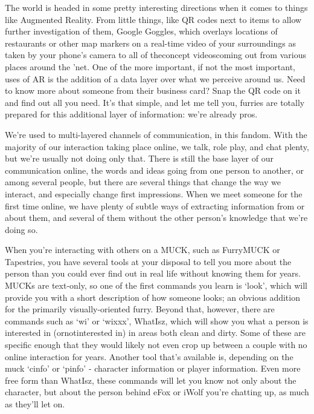 
The world is headed in some pretty interesting directions when it comes to things like Augmented Reality. From little things, like QR codes next to items to allow further investigation of them, Google Goggles, which overlays locations of restaurants or other map markers on a real-time video of your surroundings as taken by your phone's camera to all of theconcept videoscoming out from various places around the 'net. One of the more important, if not the most important, uses of AR is the addition of a data layer over what we perceive around us. Need to know more about someone from their business card? Snap the QR code on it and find out all you need. It's that simple, and let me tell you, furries are totally prepared for this additional layer of information: we're already pros.

We're used to multi-layered channels of communication, in this fandom. With the majority of our interaction taking place online, we talk, role play, and chat plenty, but we're usually not doing only that. There is still the base layer of our communication online, the words and ideas going from one person to another, or among several people, but there are several things that change the way we interact, and especially change first impressions. When we meet someone for the first time online, we have plenty of subtle ways of extracting information from or about them, and several of them without the other person's knowledge that we're doing so.

When you're interacting with others on a MUCK, such as FurryMUCK or Tapestries, you have several tools at your disposal to tell you more about the person than you could ever find out in real life without knowing them for years. MUCKs are text-only, so one of the first commands you learn is `look', which will provide you with a short description of how someone looks; an obvious addition for the primarily visually-oriented furry. Beyond that, however, there are commands such as `wi' or `wixxx', WhatIsz, which will show you what a person is interested in (ornotinterested in) in areas both clean and dirty. Some of these are specific enough that they would likely not even crop up between a couple with no online interaction for years. Another tool that's available is, depending on the muck `cinfo' or `pinfo' - character information or player information. Even more free form than WhatIsz, these commands will let you know not only about the character, but about the person behind eFox or iWolf you're chatting up, as much as they'll let on.

